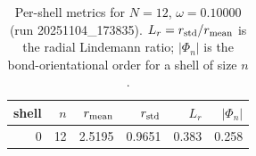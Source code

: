 \begin{table}[t]
\centering
\small
\setlength{\tabcolsep}{4pt}
\renewcommand{\arraystretch}{1.15}
\begin{tabular}{r r r r r r}
\toprule
shell & $n$ & $r_{\rm mean}$ & $r_{\rm std}$ & $L_r$ & $|\Phi_n|$ \\
\midrule
0 & 12 & 2.5195 & 0.9651 & 0.383 & 0.258 \\
\bottomrule
\end{tabular}
\caption{Per-shell metrics for $N=12$, $\omega=0.10000$ (run 20251104_173835). $L_r=r_{\rm std}/r_{\rm mean}$ is the radial Lindemann ratio; $|\Phi_n|$ is the bond-orientational order for a shell of size $n$.}
\end{table}